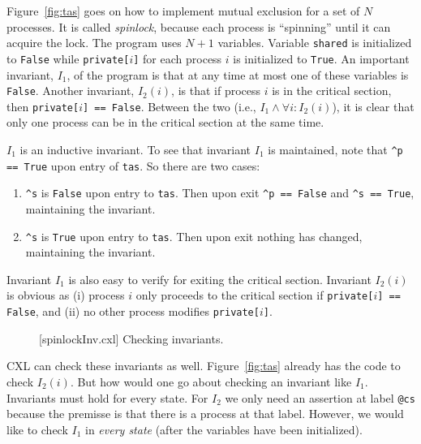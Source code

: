 \documentclass{report}
\newenvironment{code}{
\tcolorbox
}{
\endtcolorbox
}
\begin{document}
Figure~\ref{fig:tas} goes on how to implement mutual exclusion for
a set of $N$ processes.
It is called \emph{spinlock},
because each process is ``spinning'' until
it can acquire the lock.
The program uses $N+1$ variables.
Variable \texttt{shared} is initialized to \texttt{False} while
\texttt{private[$i$]} for each process $i$ is initialized to \texttt{True}.
An important invariant, $I_1$, of the program is that at any time at most
one of these variables is \texttt{False}.
Another invariant, $I_2(i)$, is that if process $i$ is in the critical section,
then \texttt{private[$i$] == False}.
Between the two (i.e., $I_1 \land \forall i: I_2(i)$),
it is clear that only one process can be in the
critical section at the same time.

$I_1$ is an inductive invariant.
To see that invariant $I_1$ is maintained, note that
\texttt{\^{}p == True} upon entry of \texttt{tas}.
So there are two cases:
\begin{enumerate}
\item \texttt{\^{}s} is \texttt{False} upon entry to \texttt{tas}.
Then upon exit \texttt{\^{}p == False} and \texttt{\^{}s == True}, maintaining
the invariant.
\item \texttt{\^{}s} is \texttt{True} upon entry to \texttt{tas}.
Then upon exit nothing has changed, maintaining the invariant.
\end{enumerate}
Invariant $I_1$ is also easy to verify for exiting the critical section.
Invariant $I_2(i)$ is obvious as (i) process $i$ only proceeds to the critical
section if \texttt{private[$i$] == False}, and (ii) no other process modifies
\texttt{private[$i$]}.

\begin{figure}
\begin{code}
\end{code}
\caption{[spinlockInv.cxl] Checking invariants.}
\label{fig:tasinv}
\end{figure}

CXL can check these invariants as well.  Figure~\ref{fig:tas} already
has the code to check $I_2(i)$.  But how would one go about checking an
invariant like $I_1$.  Invariants must hold for every state.
For $I_2$ we only need an assertion at label \texttt{@cs} because the
premisse is that there is a process at that label.  However, we would
like to check $I_1$ in \emph{every state} (after the variables have
been initialized).
\end{document}
